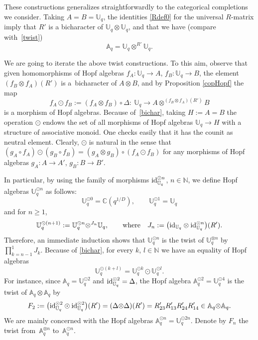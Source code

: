 \documentclass[pdftex]{sigma}%
\numberwithin{equation}{section}
\numberwithin{figure}{section}
\newcommand{\mUq}{\mathbb{U}_q}
\newcommand{\mc}{\mathbb{C}}
\newcommand{\mn}{\mathbb{N}}
\newcommand{\ra}{\rightarrow}
\begin{document}
These constructions generalizes straightforwardly to the categorical completions we consider. Taking $A=B=\mUq$, the identities \eqref{Rdef0} for the universal $R$-matrix imply that $R'$ is a bicharacter of $\mUq {\otimes} \mUq$, and that we have (compare with~\eqref{twist})
\[ \mathbb{A}_q = \mUq {\otimes} ^{R'}\mUq.\]

We are going to iterate the above twist constructions. To this aim, observe that given homomorphisms of Hopf algebras $f_A\colon \mUq \ra A$, $f_B\colon \mUq \ra B$, the element $(f_B \otimes f_A)(R')$ is a~bicharacter of $A\otimes B$, and by Proposition \ref{copHopf} the map
\[f_A \odot f_B := (f_{A} \otimes f_{B})\circ \Delta \colon \ \mUq \ra A \otimes^{(f_B \otimes f_A)(R')} B\]
 is a morphism of Hopf algebras. Because of~\eqref{bichar}, taking $H:=A=B$ the operation $\odot$ endows the set of all morphisms of Hopf algebras $\mUq\ra H$ with a structure of associative monoid. One checks easily that it has the counit as neutral element. Clearly, $\odot$ is natural in the sense that $(g_A\circ f_A) \odot (g_B\circ f_B) = (g_A\otimes g_B) \circ (f_A\odot f_B)$ for any morphisms of Hopf algebras $g_A\colon A\ra A'$, $g_B\colon B\ra B'$.

In particular, by using the family of morphisms ${\rm id}_{\mUq}^{\odot n}$, $n\in \mn$, we define Hopf algebras $\mUq^{\odot n}$ as follows:
 \[\mUq^{\odot 0} = \mc(q^{1/D}) , \qquad \mUq^{\odot 1} = \mUq\]
and for $n\geq 1$,
\[\mUq^{\odot (n+1)} := \mUq^{\odot n} {\otimes}^{J_n} \mUq,\qquad {\rm where} \quad J_n:= \big({\rm id}_{\mUq} \otimes {\rm id}_{\mUq}^{\odot n}\big)(R').\]
Therefore, an immediate induction shows that $\mUq^{\odot n}$ is the twist of $\mUq^{\otimes n}$ by $\prod_{k=n-1}^{1} J_k$. Because of \eqref{bichar}, for every $k$, $l\in \mn$ we have an equality of Hopf algebras
\begin{equation}\label{assodot}
\mUq^{\odot (k+l)} = \mUq^{\odot {k}} \odot \mUq^{\odot {l}}.
\end{equation}
For instance, since ${\mathbb A}_q = \mUq^{\odot 2}$ and ${\rm id}_{\mUq}^{\odot 2} = \Delta$, the Hopf algebra ${\mathbb A}_q^{\odot 2} = \mUq^{\odot 4}$ is the twist of ${\mathbb A}_q{\otimes} \mathbb{A}_q$ by
\begin{equation}\label{formulaF}
F_2:= \big({\rm id}_{\mUq}^{\odot 2} \odot {\rm id}_{\mUq}^{\odot 2}\big)(R') = ({\Delta} {\otimes} {\Delta})(R')=R'_{23}R'_{13}R'_{24}R'_{14}
 \in \mathbb{A}_q {\otimes} \mathbb{A}_q.
 \end{equation}
 We are mainly concerned with the Hopf algebras $\mathbb{A}_q^{\odot n} = \mUq^{\odot 2n}$. Denote by $F_n$ the twist from~$\mathbb{A}_q^{\otimes n}$ to~$\mathbb{A}_q^{\odot n}$.
\end{document}
